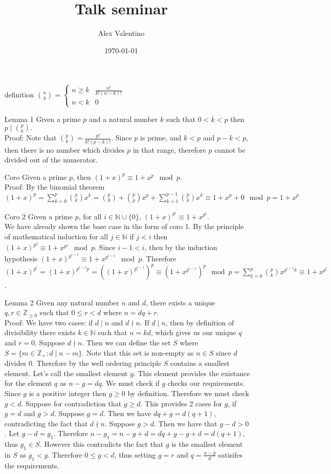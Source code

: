 \documentclass[12pt, letterpaper]{article}
\date{\today}
\author{Alex Valentino}
\title{Talk seminar}
\newcommand{\Z}{\mathbb{Z}}
\newcommand{\N}{\mathbb{N}}
\begin{document}
	\begin{enumerate}
		\item[definition] $\displaystyle \binom{n}{k} = \begin{cases} n \geq k & \frac{n!}{k! (n-k)! } \\
		n < k & 0
		\end{cases}$
	
			
		\item[Lemma 1] Given a prime $p$ and a natural number $k$ such that $0 < k < p$ then 
		$
		p \mid \binom{p}{k}.
		$\\
		Proof: Note that $\binom{p}{k} = \frac{p!}{k! (p-k)!}$.  Since $p$ is prime, and $k < p$ and $ p-k < p$, then there is no number which divides  $p$ in that range, therefore $p$ cannot be divided out of  the numerator.  
		\item[Coro] Given a prime $p$, then $(1 + x)^p \equiv 1 + x^p \mod p$.\\
		Proof: By the binomial theorem $(1+x)^p = \sum_{k=0}^p \binom{p}{k}x^k = \binom{p}{0} + \binom{p}{p} x^p + \sum_{k=1}^{p-1} \binom{p}{k}x^k \equiv 1 + x^p + 0 \mod p = 1 + x^p $
		\item[Coro 2] Given a prime $p$, for all $i \in \N \cup \{0\}$, $(1+x)^{p^i} \equiv 1 + x^{p^i}$.\\
		We have already shown the base case in the form of coro 1.  By the principle of mathematical induction for all $j \in \N$ if $j < i$ then $(1+x)^{p^j} \equiv 1 + x^{p^j} \mod p$.  Since $i - 1 < i$, then by the induction hypothesis $(1+x)^{p^{i-1}} \equiv 1 + x^{p^{i-1}} \mod p$.  Therefore $(1+x)^{p^i} = (1+x)^{p^{i-1}p} = ((1+x)^{p^{i-1}})^p \equiv (1+x^{p^{i-1}})^p \mod p = \sum_{k=0}^p \binom{p}{k} x^{p^{i-1}k} \equiv 1 + x^{p^i}$ .
		\item[Lemma 2] Given any natural number $n$ and $d$, there exists a unique $q,r \in \Z_{\geq 0}$ such that $0 \leq r < d $ where $n = dq + r$.\\
		Proof: We have two cases: if $d \mid n$ and $d \nmid n$.  If $d \mid n$, then by definition of divisibility there exists $k \in \N$ such that $n = kd$, which gives us our unique $q$ and $r = 0$.  Suppose $d \nmid n$.  Then we can define the set $S$ where $S = \{m \in \Z_+ : d \mid n - m\}$.  Note that this set is non-empty as $n \in S$ since $d$ divides $0$.  Therefore by the well ordering principle $S$ contains a smallest element.   Let's call the smallest element $g$. This element provides the existance for the element $q$ as $n -g = dq$.  We must check if $g$ checks our requirements.  Since $g$ is a positive integer then $g \geq 0$ by definition.  Therefore we must check $g < d$.  Suppose for contradiction that $g \geq d$.  This provides 2 cases for $g$, if $g=d$ and $g > d$.  Suppose $g = d$.  Then we have $dq + g = d(q+1)$, contradicting the fact that $d \nmid n$.  Suppose $g > d$.  Then we have that $g -d > 0$.  Let $g -d  = g_1$.  Therefore $n - g_1 = n -g + d = dq + g - g + d = d(q+1)$, thus $g_1 \in S$.  However this contradicts the fact that $g$ is the smallest element in $S$ as $g_1 < g$.  Therefore $0 \leq g < d$, thus setting $g = r$ and $q = \frac{n-g}{d}$ satisifes the requirements.\\
		

\end{enumerate}
\end{document}
